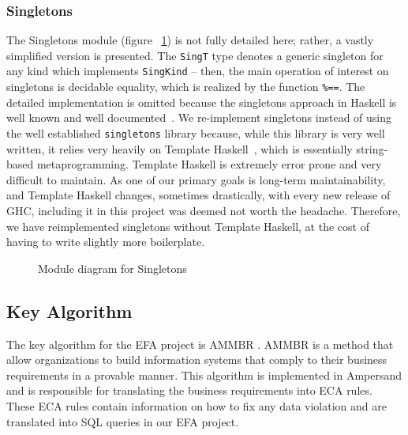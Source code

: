     
\subsubsection{Singletons}\label{subsec:Singletons}

The Singletons module (figure ~\ref{fig:singletons}) is 
not fully detailed here; rather, a vastly simplified version is presented. The
\lstinline{SingT} type denotes a generic singleton for 
any kind which implements
\lstinline{SingKind} -- then, the main operation of 
interest on singletons is
decidable equality, which is realized by the function 
\lstinline{%==}. The
    detailed implementation is omitted because the 
    singletons approach in Haskell
    is well known and well 
    documented~\cite{singletons}. We re-implement
    singletons instead of using the well established 
    \texttt{singletons} library
    because, while this library is very well written, 
    it relies very heavily on
    Template Haskell~\cite{th}, which is essentially 
    string-based
    metaprogramming. Template Haskell is extremely 
    error prone and very difficult
    to maintain. As one of our primary goals is 
    long-term maintainability, and
    Template Haskell changes, sometimes drastically, 
    with every new release of
    GHC, including it in this project was deemed not 
    worth the
    headache. Therefore, we have reimplemented 
    singletons without Template
    Haskell, at the cost of having to write slightly 
    more boilerplate.


\begin{figure}[!ht]
    \caption{Module diagram for Singletons} \label{fig:singletons}
\end{figure}

\subsection{Key Algorithm}
The key algorithm for the EFA project is AMMBR \cite{AMMBR}. AMMBR is a method 
that allow organizations to build information systems that comply to their 
business requirements in a provable manner. This algorithm is implemented in 
Ampersand and is responsible for translating the business requirements into ECA 
rules. These ECA rules contain information on how to fix any data violation and 
are translated into SQL queries in our EFA project.

